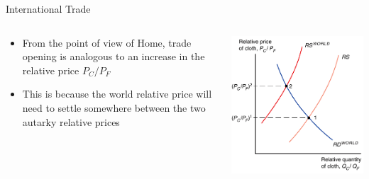 \documentclass[10pt,hyperref={CJKbookmarks=true},xcolor=dvipsnames,aspectratio=169]{beamer}
\begin{document}
\begin{frame}{International Trade}


\begin{columns}[onlytextwidth]
\begin{column}{0.4\textwidth}
\begin{itemize}
\item From the point of view of Home, trade opening is analogous to an increase
in the relative price $P_{C}/P_{F}$
\item This is because the world relative price will need to settle somewhere
between the two autarky relative prices 
\end{itemize}

\end{column}
\begin{column}{0.6\textwidth}
\centering \includegraphics[width=0.7\columnwidth]{fig/sfm/lec4-21}
\end{column}
\end{columns}

\end{frame}
\end{document}
